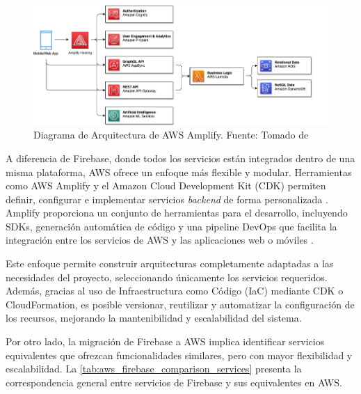 \newcommand\AWSDiagramaArquitecturaCaption{Diagrama de Arquitectura de AWS Amplify. \hspace{1em}}

\begin{figure}[H]
  \centering
  \includegraphics[width=1\textwidth]{img/figures/fig4-amplify-architecture.png}
  \caption[\AWSDiagramaArquitecturaCaption]{\AWSDiagramaArquitecturaCaption Fuente: Tomado de \cite{Michael2021}}
  \label{fig:amplify_architecture}
\end{figure}

A diferencia de Firebase, donde todos los servicios están integrados dentro de una misma plataforma, AWS ofrece un enfoque más flexible y modular. Herramientas como AWS Amplify y el Amazon Cloud Development Kit (CDK) permiten definir, configurar e implementar servicios \textit{backend} de forma personalizada \cite{Michael2021}. Amplify proporciona un conjunto de herramientas para el desarrollo, incluyendo SDKs, generación automática de código y una pipeline DevOps que facilita la integración entre los servicios de AWS y las aplicaciones web o móviles \cite{Michael2021}.

Este enfoque permite construir arquitecturas completamente adaptadas a las necesidades del proyecto, seleccionando únicamente los servicios requeridos. Además, gracias al uso de Infraestructura como Código (IaC) mediante CDK o CloudFormation, es posible versionar, reutilizar y automatizar la configuración de los recursos, mejorando la mantenibilidad y escalabilidad del sistema.

Por otro lado, la migración de Firebase a AWS implica identificar servicios equivalentes que ofrezcan funcionalidades similares, pero con mayor flexibilidad y escalabilidad. La \autoref{tab:aws_firebase_comparison_services} presenta la correspondencia general entre servicios de Firebase y sus equivalentes en AWS.

